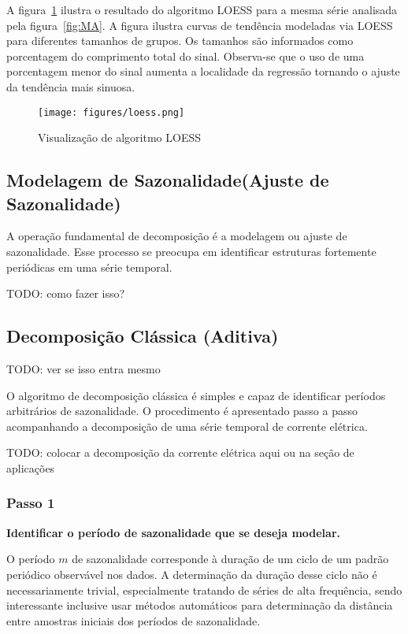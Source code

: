 A figura~\ref{fig:loess} ilustra o resultado do algoritmo LOESS para a mesma
série analisada pela figura~\ref{fig:MA}. A figura ilustra curvas de tendência
modeladas via LOESS para diferentes tamanhos de grupos. Os tamanhos são
informados como porcentagem do comprimento total do sinal. Observa-se que o uso
de uma porcentagem menor do sinal aumenta a localidade da regressão tornando o
ajuste da tendência mais sinuosa.

\begin{figure}[H]
    \centering
    \texttt{[image: figures/loess.png]}
    \caption{Visualização de algoritmo LOESS}
    \label{fig:loess}
\end{figure}

\subsection{Modelagem de Sazonalidade(Ajuste de Sazonalidade)}

A operação fundamental de decomposição é a modelagem ou ajuste de sazonalidade.
Esse processo se preocupa em identificar estruturas fortemente periódicas em
uma série temporal.

TODO: como fazer isso?

\subsection{Decomposição Clássica (Aditiva)}

TODO: ver se isso entra mesmo

O algoritmo de decomposição clássica é simples e capaz de identificar períodos
arbitrários de sazonalidade. O procedimento é apresentado passo a passo
acompanhando a decomposição de uma série temporal de corrente elétrica.

TODO: colocar a decomposição da corrente elétrica aqui ou na seção de aplicações

\subsubsection{Passo 1}

\textbf{Identificar o período de sazonalidade que se deseja modelar.}

O período $m$ de sazonalidade corresponde à duração de um ciclo de um padrão
periódico observável nos dados. A determinação da duração desse ciclo não é
necessariamente trivial, especialmente tratando de séries de alta frequência,
sendo interessante inclusive usar métodos automáticos para determinação da
distância entre amostras iniciais dos períodos de sazonalidade.

